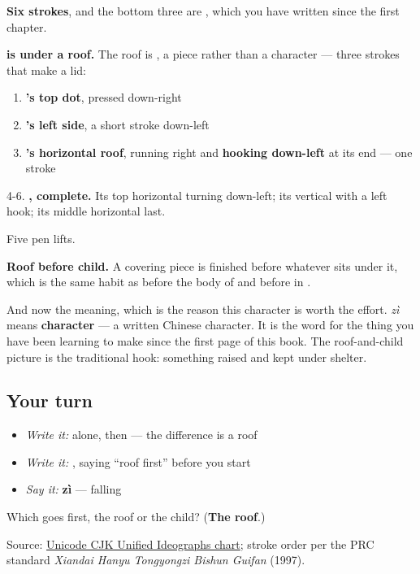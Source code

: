 \begin{quote}
\end{quote}

\textbf{Six strokes}, and the bottom three are , which you have written since the first chapter.

\textbf{ is  under a roof.} The roof is \textbf{}, a piece rather than a character — three strokes that make a lid:

\begin{enumerate}
\raggedright
  \item \textbf{'s top dot}, pressed down-right
  \item \textbf{'s left side}, a short stroke down-left
  \item \textbf{'s horizontal roof}, running right and \textbf{hooking down-left} at its end — one stroke
\end{enumerate}

4-6. \textbf{, complete.} Its top horizontal turning down-left; its vertical with a left hook; its middle horizontal last.

Five pen lifts.

\textbf{Roof before child.} A covering piece is finished before whatever sits under it, which is the same habit as  before the body of  and  before  in .

And now the meaning, which is the reason this character is worth the effort. \textbf{} \emph{zì} means \textbf{character} — a written Chinese character. It is the word for the thing you have been learning to make since the first page of this book. The roof-and-child picture is the traditional hook: something raised and kept under shelter.

\subsection*{Your turn}
\begin{itemize}
\raggedright
  \item \emph{Write it:}  alone, then  — the difference is a roof
  \item \emph{Write it:} , saying \textquotedblleft{}roof first\textquotedblright{} before you start
  \item \emph{Say it:} \textbf{zì} — falling
\end{itemize}

\begin{tcolorbox}[breakable,colback=teal!4,colframe=teal!35!black,title={Before you move on}]
Which goes first, the roof or the child? (\textbf{The roof}.)

Source: \href{https://www.unicode.org/charts/PDF/U4E00.pdf}{Unicode CJK Unified Ideographs chart}; stroke order per the PRC standard \emph{Xiandai Hanyu Tongyongzi Bishun Guifan} (1997).
\end{tcolorbox}
